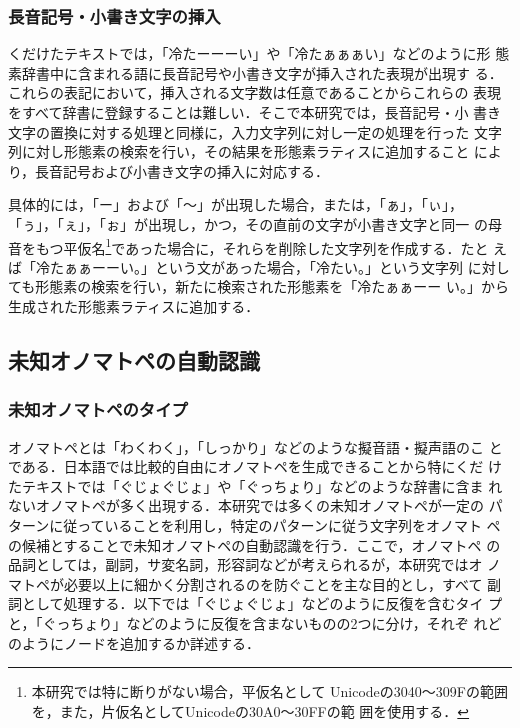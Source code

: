\documentclass[japanese]{jnlp_1.4}
\begin{document}
   \subsubsection{長音記号・小書き文字の挿入}

   くだけたテキストでは，「冷たーーーい」や「冷たぁぁぁい」などのように形
   態素辞書中に含まれる語に長音記号や小書き文字が挿入された表現が出現す
   る．これらの表記において，挿入される文字数は任意であることからこれらの
   表現をすべて辞書に登録することは難しい．そこで本研究では，長音記号・小
   書き文字の置換に対する処理と同様に，入力文字列に対し一定の処理を行った
   文字列に対し形態素の検索を行い，その結果を形態素ラティスに追加すること
   により，長音記号および小書き文字の挿入に対応する．

   具体的には，「ー」および「〜」が出現した場合，または，「ぁ」，「ぃ」，
   「ぅ」，「ぇ」，「ぉ」が出現し，かつ，その直前の文字が小書き文字と同一
   の母音をもつ平仮名\footnote{本研究では特に断りがない場合，平仮名として
   Unicodeの3040〜309Fの範囲を，また，片仮名としてUnicodeの30A0〜30FFの範
   囲を使用する．}であった場合に，それらを削除した文字列を作成する．たと
   えば「冷たぁぁーーい。」という文があった場合，「冷たい。」という文字列
   に対しても形態素の検索を行い，新たに検索された形態素を「冷たぁぁーー
   い。」から生成された形態素ラティスに追加する．


  \subsection{未知オノマトペの自動認識}

   \subsubsection{未知オノマトペのタイプ}

   オノマトペとは「わくわく」，「しっかり」などのような擬音語・擬声語のこ
   とである．日本語では比較的自由にオノマトペを生成できることから特にくだ
   けたテキストでは「ぐじょぐじょ」や「ぐっちょり」などのような辞書に含ま
   れないオノマトペが多く出現する．本研究では多くの未知オノマトペが一定の
   パターンに従っていることを利用し，特定のパターンに従う文字列をオノマト
   ペの候補とすることで未知オノマトペの自動認識を行う．ここで，オノマトペ
   の品詞としては，副詞，サ変名詞，形容詞などが考えられるが，本研究ではオ
   ノマトペが必要以上に細かく分割されるのを防ぐことを主な目的とし，すべて
   副詞として処理する．以下では「ぐじょぐじょ」などのように反復を含むタイ
   プと，「ぐっちょり」などのように反復を含まないものの2つに分け，それぞ
   れどのようにノードを追加するか詳述する．
\end{document}
